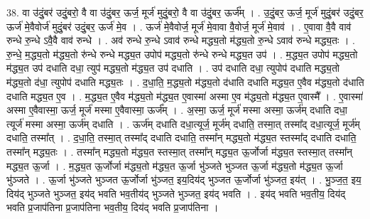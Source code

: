 \documentclass[17pt]{extarticle}
\begin{document}
38. वा उ॑दुं॒बर॑ उदुं॒बरो॒ वै वा उ॑दुं॒बर॒ ऊर्ज॒ मूर्ज॑ मुदुं॒बरो॒ वै वा उ॑दुं॒बर॒ ऊर्ज᳚म् । . उ॒दुं॒बर॒ ऊर्ज॒ मूर्ज॑ मुदुं॒बर॑ उदुं॒बर॒ ऊर्ज॑ मे॒वैवोर्ज॑ मुदुं॒बर॑ उदुं॒बर॒ ऊर्ज॑ मे॒व । . ऊर्ज॑ मे॒वैवोर्ज॒ मूर्ज॑ मे॒वावा वै॒वोर्ज॒ मूर्ज॑ मे॒वाव॑ । . ए॒वावा वै॒वै वाव॑ रुन्धे रु॒न्धे ऽवै॒वै वाव॑ रुन्धे । . अव॑ रुन्धे रु॒न्धे ऽवाव॑ रुन्धे मद्ध्य॒तो म॑द्ध्य॒तो रु॒न्धे ऽवाव॑ रुन्धे मद्ध्य॒तः । . रु॒न्धे॒ म॒द्ध्य॒तो म॑द्ध्य॒तो रु॑न्धे रुन्धे मद्ध्य॒त उपोप॑ मद्ध्य॒तो रु॑न्धे रुन्धे मद्ध्य॒त उप॑ । . म॒द्ध्य॒त उपोप॑ मद्ध्य॒तो म॑द्ध्य॒त उप॑ दधाति दधा॒ त्युप॑ मद्ध्य॒तो म॑द्ध्य॒त उप॑ दधाति । . उप॑ दधाति दधा॒ त्युपोप॑ दधाति मद्ध्य॒तो म॑द्ध्य॒तो द॑धा॒ त्युपोप॑ दधाति मद्ध्य॒तः । . द॒धा॒ति॒ म॒द्ध्य॒तो म॑द्ध्य॒तो द॑धाति दधाति मद्ध्य॒त ए॒वैव म॑द्ध्य॒तो द॑धाति दधाति मद्ध्य॒त ए॒व । . म॒द्ध्य॒त ए॒वैव म॑द्ध्य॒तो म॑द्ध्य॒त ए॒वास्मा॑ अस्मा ए॒व म॑द्ध्य॒तो म॑द्ध्य॒त ए॒वास्मै᳚ । . ए॒वास्मा॑ अस्मा ए॒वैवास्मा॒ ऊर्ज॒ मूर्ज॑ मस्मा ए॒वैवास्मा॒ ऊर्ज᳚म् । . अ॒स्मा॒ ऊर्ज॒ मूर्ज॑ मस्मा अस्मा॒ ऊर्ज॑म् दधाति दधा॒ त्यूर्ज॑ मस्मा अस्मा॒ ऊर्ज॑म् दधाति । . ऊर्ज॑म् दधाति दधा॒त्यूर्ज॒ मूर्ज॑म् दधाति॒ तस्मा॒त् तस्मा᳚द् दधा॒त्यूर्ज॒ मूर्ज॑म् दधाति॒ तस्मा᳚त् । . द॒धा॒ति॒ तस्मा॒त् तस्मा᳚द् दधाति दधाति॒ तस्मा᳚न् मद्ध्य॒तो म॑द्ध्य॒त स्तस्मा᳚द् दधाति दधाति॒ तस्मा᳚न् मद्ध्य॒तः । . तस्मा᳚न् मद्ध्य॒तो म॑द्ध्य॒त स्तस्मा॒त् तस्मा᳚न् मद्ध्य॒त ऊ॒र्जोर्जा म॑द्ध्य॒त स्तस्मा॒त् तस्मा᳚न् मद्ध्य॒त ऊ॒र्जा । . म॒द्ध्य॒त ऊ॒र्जोर्जा म॑द्ध्य॒तो म॑द्ध्य॒त ऊ॒र्जा भु॑ञ्जते भुञ्जत ऊ॒र्जा म॑द्ध्य॒तो म॑द्ध्य॒त ऊ॒र्जा भु॑ञ्जते । . ऊ॒र्जा भु॑ञ्जते भुञ्जत ऊ॒र्जोर्जा भु॑ञ्जत॒ इय॒दिय॑द् भुञ्जत ऊ॒र्जोर्जा भु॑ञ्जत॒ इय॑त् । . भु॒ञ्ज॒त॒ इय॒ दिय॑द् भुञ्जते भुञ्जत॒ इय॑द् भवति भव॒तीय॑द् भुञ्जते भुञ्जत॒ इय॑द् भवति । . इय॑द् भवति भव॒तीय॒ दिय॑द् भवति प्र॒जाप॑तिना प्र॒जाप॑तिना भव॒तीय॒ दिय॑द् भवति प्र॒जाप॑तिना । \newline
\end{document}
